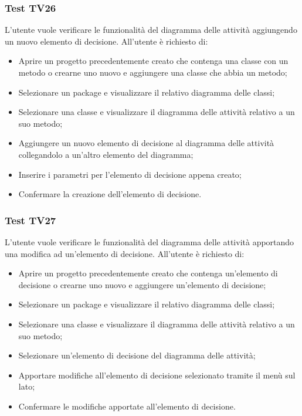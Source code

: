 \documentclass[../PianoDiQualifica.tex]{subfiles}
\begin{document}
	\subsubsection{Test TV26} 
	L'utente vuole verificare le funzionalità del diagramma delle attività aggiungendo un nuovo elemento di decisione. 
	All'utente è richiesto di: 
	\begin{itemize} 
		\item Aprire un progetto precedentemente creato che contenga una classe con un metodo o crearne uno nuovo e aggiungere una classe che abbia un metodo;
		\item Selezionare un package e visualizzare il relativo diagramma delle classi; 
		\item Selezionare una classe e visualizzare il diagramma delle attività relativo a un suo metodo; %
		\item Aggiungere un nuovo elemento di decisione al diagramma delle attività collegandolo a un'altro elemento del diagramma; 
		\item Inserire i parametri per l'elemento di decisione appena creato; %
		\item Confermare la creazione dell'elemento di decisione. 
	\end{itemize} 
	
	\subsubsection{Test TV27} 
	L'utente vuole verificare le funzionalità del diagramma delle attività apportando una modifica ad un'elemento di decisione. 
	All'utente è richiesto di: 
	\begin{itemize}  
		\item Aprire un progetto precedentemente creato che contenga un'elemento di decisione o crearne uno nuovo e aggiungere un'elemento di decisione;
		\item Selezionare un package e visualizzare il relativo diagramma delle classi; 
		\item Selezionare una classe e visualizzare il diagramma delle attività relativo a un suo metodo; 
		\item Selezionare un'elemento di decisione del diagramma delle attività; 
		\item Apportare modifiche all'elemento di decisione selezionato tramite il menù sul lato; %
		\item Confermare le modifiche apportate all'elemento di decisione. 
	\end{itemize} 
	
\end{document}
